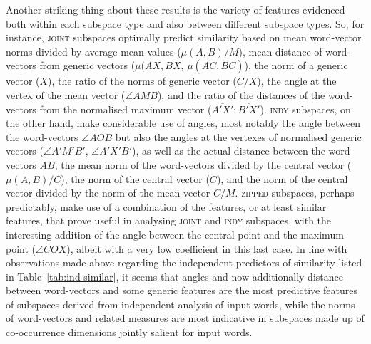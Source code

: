 Another striking thing about these results is the variety of features evidenced both within each subspace type and also between different subspace types.  So, for instance, \textsc{joint} subspaces optimally predict similarity based on mean word-vector norms divided by average mean values ($\mu(A,B)/M$), mean distance of word-vectors from generic vectors ($\mu(\overline{AX},\overline{BX}$, $\mu(\overline{AC},\overline{BC})$), the norm of a generic vector ($X$), the ratio of the norms of generic vector ($C/X$), the angle at the vertex of the mean vector ($\angle AMB$), and the ratio of the distances of the word-vectors from the normalised maximum vector ($\overline{A'X'}:\overline{B'X'}$).  \textsc{indy} subspaces, on the other hand, make considerable use of angles, most notably the angle between the word-vectors $\angle AOB$ but also the angles at the vertexes of normalised generic vectors ($\angle A'M'B'$, $\angle A'X'B'$), as well as the actual distance between the word-vectors $\overline{AB}$, the mean norm of the word-vectors divided by the central vector ($\mu (A,B)/C$), the norm of the central vector ($C$), and the norm of the central vector divided by the norm of the mean vector $C/M$.  \textsc{zipped} subspaces, perhaps predictably, make use of a combination of the features, or at least similar features, that prove useful in analysing \textsc{joint} and \textsc{indy} subspaces, with the interesting addition of the angle between the central point and the maximum point ($\angle COX$), albeit with a very low coefficient in this last case.  In line with observations made above regarding the independent predictors of similarity listed in Table~\ref{tab:ind-similar}, it seems that angles and now additionally distance between word-vectors and some generic features are the most predictive features of subspaces derived from independent analysis of input words, while the norms of word-vectors and related measures are most indicative in subspaces made up of co-occurrence dimensions jointly salient for input words.

